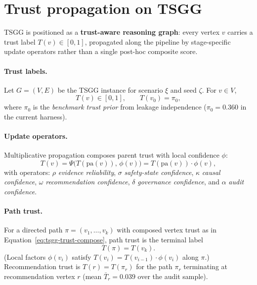 \section{Trust propagation on TSGG}
\label{sec:trust-propagation}

TSGG is positioned as a \textbf{trust-aware reasoning graph}: every vertex $v$ carries
a trust label $T(v)\in[0,1]$, propagated along the pipeline by stage-specific update
operators rather than a single post-hoc composite score.

\paragraph{Trust labels.}
Let $G=(V,E)$ be the TSGG instance for scenario $\xi$ and seed $\zeta$.
For $v\in V$,
\begin{equation}
  \label{eq:tsgg-trust-node}
  T(v) \in [0,1], \qquad T(v_0) = \pi_0,
\end{equation}
where $\pi_0$ is the \emph{benchmark trust prior} from leakage independence
($\pi_0=0.360$ in the current harness).

\paragraph{Update operators.}
Multiplicative propagation composes parent trust with local confidence $\phi$:
\begin{equation}
  \label{eq:tsgg-trust-compose}
  T(v) = \Psi\bigl(T(\mathrm{pa}(v)),\,\phi(v)\bigr)
  = T(\mathrm{pa}(v))\cdot \phi(v),
\end{equation}
with operators:
$\rho$ \emph{evidence reliability},
$\sigma$ \emph{safety-state confidence},
$\kappa$ \emph{causal confidence},
$\omega$ \emph{recommendation confidence},
$\delta$ \emph{governance confidence}, and
$\alpha$ \emph{audit confidence}.

\paragraph{Path trust.}
For a directed path $\pi=(v_1,\ldots,v_k)$ with composed vertex trust as in
Equation~\eqref{eq:tsgg-trust-compose}, path trust is the terminal label
\begin{equation}
  \label{eq:tsgg-path-trust}
  T(\pi) = T(v_k).
\end{equation}
(Local factors $\phi(v_i)$ satisfy $T(v_i)=T(v_{i-1})\cdot\phi(v_i)$ along $\pi$.)
Recommendation trust is $T(r)=T(\pi_r)$ for the path $\pi_r$ terminating at recommendation
vertex $r$ (mean $\bar{T}_r=0.039$ over the audit sample).

